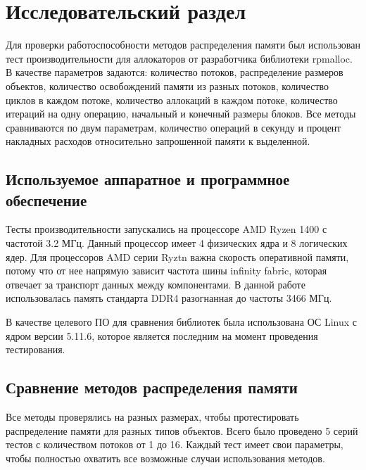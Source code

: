 \chapter{Исследовательский раздел}
Для проверки работоспособности методов распределения памяти был использован тест производительности для аллокаторов от разработчика библиотеки rpmalloc\cite{rpmalloc-bench}. В качестве параметров задаются: количество потоков, распределение размеров объектов, количество освобождений памяти из разных потоков, количество циклов в каждом потоке, количество аллокаций в каждом потоке, количество итераций на одну операцию, начальный и конечный размеры блоков. Все методы сравниваются по двум параметрам, количество операций в секунду и процент накладных расходов относительно запрошенной памяти к выделенной.

\section{Используемое аппаратное и программное обеспечение}
Тесты производительности запускались на процессоре AMD Ryzen 1400  с частотой 3.2 МГц. Данный процессор имеет 4 физических ядра и 8 логических ядер. Для процессоров AMD серии Ryztn важна скорость оперативной памяти, потому что от нее напрямую зависит частота шины infinity fabric\cite{infinity-fabric}, которая отвечает за транспорт данных между компонентами. В данной работе использовалась память стандарта DDR4 разогнанная до частоты 3466 МГц.

В качестве целевого ПО для сравнения библиотек была использована ОС Linux с ядром версии 5.11.6, которое является последним на момент проведения тестирования.

\section{Сравнение методов распределения памяти}
Все методы проверялись на разных размерах, чтобы протестировать распределение памяти для разных типов объектов.  Всего было проведено 5 серий тестов с количеством потоков от 1 до 16. Каждый тест имеет свои параметры, чтобы полностью охватить все возможные случаи использования методов.


